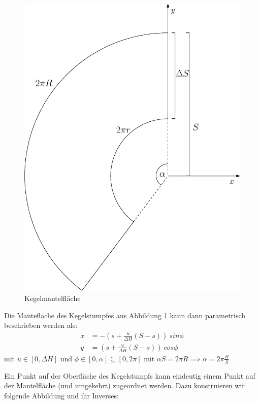\begin{figure}[!htb]
	\centering
	\includegraphics[scale=.4]{images/coneLateral.eps}
	\caption{Kegelmantelfläche}
	\label{fig:coneLateral}
\end{figure}

Die Mantefläche des Kegelstumpfes aus Abbildung \ref{fig:coneLateral} kann dann parametrisch beschrieben werden als:
\begin{equation} \label{eq:paramLateral}
\begin{aligned}
x &= -(s + \frac{u}{\Delta H}(S-s)) ~sin \phi \\
y &= (s + \frac{u}{\Delta H} (S-s)) ~cos \phi
\end{aligned}
\end{equation}
mit  $u\in [0, \Delta H]$ und $\phi \in [0, \alpha] \subseteq [0, 2\pi]$ mit $\alpha S = 2\pi R \implies \alpha = 2\pi\frac{R}{S}$


Ein Punkt auf der Oberfläche des Kegelstumpfs kann eindeutig einem Punkt auf der Mantelfläche (und umgekehrt) zugeordnet werden. Dazu konstruieren wir folgende Abbildung und ihr Inverses:

